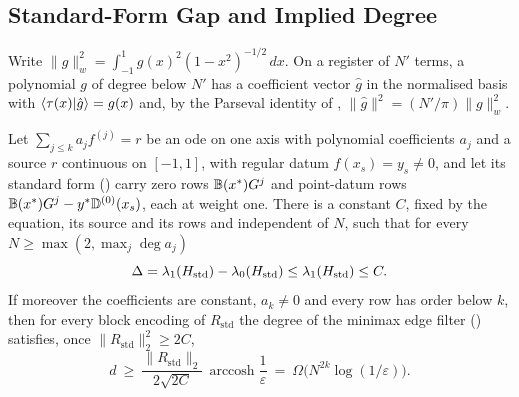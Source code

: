 \subsection{Standard-Form Gap and Implied Degree}
\label{app:std-gap}

Write $\|g\|_w^2=\int_{-1}^{1}g(x)^2(1-x^2)^{-1/2}\,dx$. On a register of $N'$ terms, a polynomial $g$ of degree below $N'$ has a coefficient vector $\hat g$ in the normalised basis with $\braket{\tau(x)|\hat g}=g(x)$ and, by the Parseval identity of , $\|\hat g\|^2=(N'/\pi)\|g\|_w^2$.

\begin{proposition}
\label{prop:std-gap-bound}
Let $\sum_{j\le k}a_jf^{(j)}=r$ be an \gls{ode} on one axis with polynomial coefficients $a_j$ and a source $r$ continuous on $[-1,1]$, with regular datum $f(x_s)=y_s\ne0$, and let its standard form () carry zero rows $\mathbb{B}(x^*)G^{j}$ and point-datum rows $\mathbb{B}(x^*)G^{j}-y^*\mathbb{D}^{(0)}(x_s)$, each at weight one. There is a constant $C$, fixed by the equation, its source and its rows and independent of $N$, such that for every $N\ge\max(2,\max_j\deg a_j)$
\begin{equation*}
    \Delta=\lambda_1(H_{\mathrm{std}})-\lambda_0(H_{\mathrm{std}})\le\lambda_1(H_{\mathrm{std}})\le C .
\end{equation*}
If moreover the coefficients are constant, $a_k\ne0$ and every row has order below $k$, then for every block encoding of $R_{\mathrm{std}}$ the degree of the minimax edge filter () satisfies, once $\|R_{\mathrm{std}}\|_2^2\ge2C$,
\begin{equation*}
    d\ \ge\ \frac{\|R_{\mathrm{std}}\|_2}{2\sqrt{2C}}\,\operatorname{arccosh}\frac1\varepsilon\ =\ \Omega\bigl(N^{2k}\log(1/\varepsilon)\bigr).
\end{equation*}
\end{proposition}
